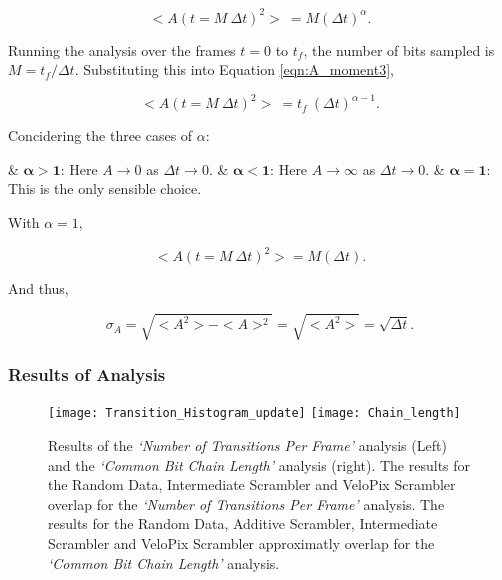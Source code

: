 \begin{description}
					\begin{equation}
						<A(t = M\ \Delta t)^2>\ = M (\Delta t)^\alpha.
						\label{eqn:A_moment3}
					\end{equation}

					Running the analysis over the frames $t = 0$ to $t_f$, the number of bits sampled is $M = {t_f / \Delta t}$. Substituting this into Equation \ref{eqn:A_moment3},

					\begin{equation}
						<A(t = M\ \Delta t)^2>\ = t_f\ (\Delta t)^{\alpha -1}.
					\end{equation}

					Concidering the three cases of $\alpha$:

					\begin{easylist}[itemize]
						& $\bm{\alpha > 1}$: Here $A \to 0$ as $\Delta t \to 0$.
						& $\bm{\alpha < 1}$: Here $A \to \infty$ as $\Delta t \to 0$.
						& $\bm{\alpha = 1}$: This is the only sensible choice.
					\end{easylist}

					With $\alpha =1$,

					\begin{equation}
						<A(t = M\ \Delta t)^2> = M (\Delta t).
					\end{equation}

					And thus,

					\begin{equation}
						\sigma_{A} = \sqrt{<A^2> - <A>^2} = \sqrt{<A^2>} = \sqrt{\Delta t}.
					\end{equation}

			\end{description}	

		\newpage
		\subsubsection{Results of Analysis}
			\vspace{-7mm}
			\begin{figure}[h]
				\centering
				\texttt{[image: Transition\_Histogram\_update]}
				\texttt{[image: Chain\_length]}
				\caption{Results of the \textit{`Number of Transitions Per Frame'} analysis (Left) and the \textit{`Common Bit Chain Length'} analysis (right). The results for the Random Data, Intermediate Scrambler and VeloPix Scrambler overlap for the \textit{`Number of Transitions Per Frame'} analysis. The results for the Random Data, Additive Scrambler, Intermediate Scrambler and VeloPix Scrambler approximatly overlap for the \textit{`Common Bit Chain Length'} analysis.}
				\label{fig:transitions_per_frame}
			\end{figure} \FloatBarrier

